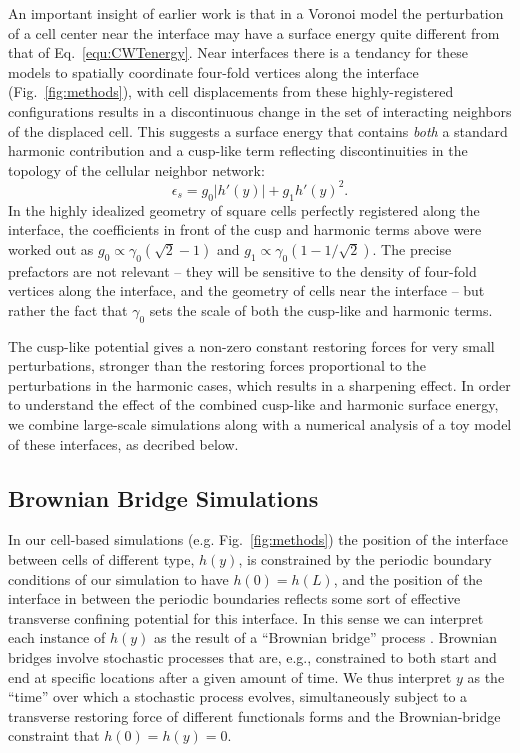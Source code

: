 \documentclass[twoside,twocolumn,9pt]{article}
\begin{document}
An important insight of earlier work\cite{sussman2018soft} is that in a Voronoi model the perturbation of a cell center near the interface may have a surface energy quite different from that of Eq.~\ref{equ:CWTenergy}. Near interfaces there is a tendancy for these models to spatially coordinate four-fold vertices along the interface (Fig.~\ref{fig:methods}), with cell displacements from these highly-registered configurations results in a discontinuous change in the set of interacting neighbors of the displaced cell. This suggests a surface energy that contains \emph{both} a standard harmonic contribution and a cusp-like term reflecting discontinuities in the topology of the cellular neighbor network:
\begin{equation}
    \epsilon_s = g_0 |h'(y)| + g_1 h'(y)^2.
\end{equation}
In the highly idealized geometry of square cells perfectly registered along the interface, the coefficients in front of the cusp and harmonic terms above were worked out as $g_0 \propto \gamma_0(\sqrt{2}-1)$ and $g_1 \propto \gamma_0(1-1/\sqrt{2})$. The precise prefactors are not relevant -- they will be sensitive to the density of four-fold vertices along the interface, and the geometry of cells near the interface -- but rather the  fact that $\gamma_0$ sets the scale of both the cusp-like and harmonic terms. 

The cusp-like potential gives a non-zero constant restoring forces for very small perturbations, stronger than the restoring forces proportional to the perturbations in the harmonic cases, which results in a sharpening effect\cite{sussman2018soft,lawson2024differences}. In order to understand the effect of the combined cusp-like and harmonic surface energy, we combine large-scale simulations along with a numerical analysis of a toy model of these interfaces, as decribed below. 

\subsection{Brownian Bridge Simulations\label{sec:BrownianBridgeSimulations}}
In our cell-based simulations (e.g. Fig.~\ref{fig:methods}) the position of the interface between cells of different type, $h(y)$, is constrained by the periodic boundary conditions of our simulation to have $h(0)=h(L)$, and the position of the interface in between the periodic boundaries reflects some sort of effective transverse confining potential for this interface. In this sense we can interpret each instance of $h(y)$ as the result of a ``Brownian bridge'' process \cite{ross1995stochastic}. Brownian bridges involve stochastic processes that are, e.g., constrained to both start and end at specific locations after a given amount of time. We thus interpret $y$ as the ``time'' over which a stochastic process evolves, simultaneously subject to a transverse restoring force of different functionals forms and the Brownian-bridge constraint that $h(0)=h(y)=0$. 
\end{document}
